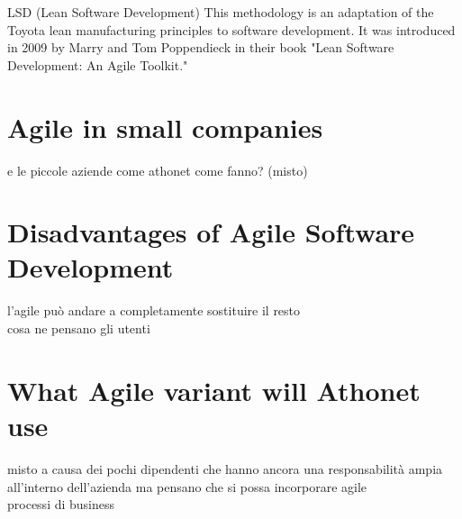 
LSD (Lean Software Development)
This methodology is an adaptation of the Toyota lean manufacturing principles to software development. It was introduced in 2009 by Marry and Tom Poppendieck in their book "Lean Software Development: An Agile Toolkit."

\section{Agile in small companies}
	e le piccole aziende come athonet come fanno? (misto)

\section{Disadvantages of Agile Software Development}
	l'agile può andare a completamente sostituire il resto\\
	cosa ne pensano gli utenti

\section{What Agile variant will Athonet use}
	misto a causa dei pochi dipendenti che hanno ancora una responsabilità ampia all'interno dell'azienda ma pensano che si possa incorporare agile\\
	processi di business

